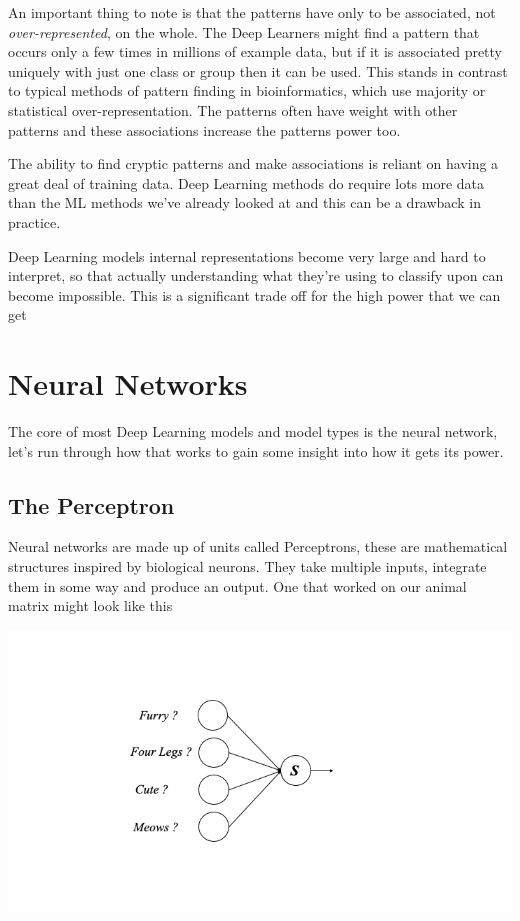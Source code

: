 \documentclass[
]{book}
\begin{document}
An important thing to note is that the patterns have only to be associated, not \emph{over-represented}, on the whole. The Deep Learners might find a pattern that occurs only a few times in millions of example data, but if it is associated pretty uniquely with just one class or group then it can be used. This stands in contrast to typical methods of pattern finding in bioinformatics, which use majority or statistical over-representation. The patterns often have weight with other patterns and these associations increase the patterns power too.

The ability to find cryptic patterns and make associations is reliant on having a great deal of training data. Deep Learning methods do require lots more data than the ML methods we've already looked at and this can be a drawback in practice.

Deep Learning models internal representations become very large and hard to interpret, so that actually understanding what they're using to classify upon can become impossible. This is a significant trade off for the high power that we can get

\hypertarget{neural-networks}{%
\section{Neural Networks}\label{neural-networks}}

The core of most Deep Learning models and model types is the neural network, let's run through how that works to gain some insight into how it gets its power.

\hypertarget{the-perceptron}{%
\subsection{The Perceptron}\label{the-perceptron}}

Neural networks are made up of units called Perceptrons, these are mathematical structures inspired by biological neurons. They take multiple inputs, integrate them in some way and produce an output. One that worked on our animal matrix might look like this

\includegraphics{figs/percepwts/Slide1.png}
\end{document}
